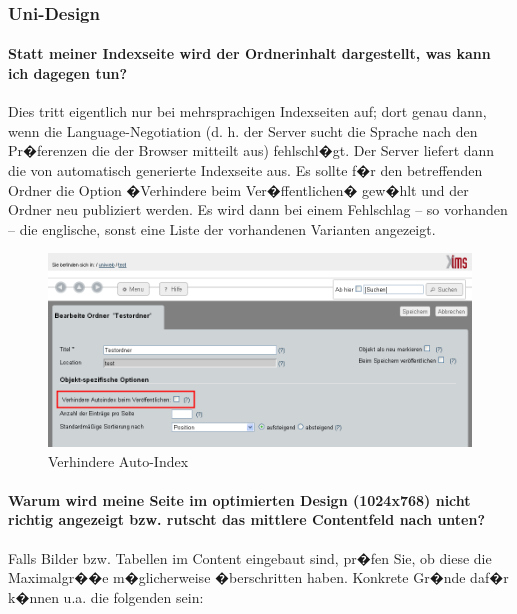 \subsubsection{Uni-Design}
\label{faq-unidesign}

\paragraph{Statt meiner Indexseite wird der Ordnerinhalt dargestellt, was kann ich
dagegen tun?}

Dies tritt eigentlich nur bei mehrsprachigen Indexseiten auf; dort genau dann, wenn
die Language-Negotiation (d. h. der Server sucht die Sprache nach den Pr�ferenzen
die der Browser mitteilt aus) fehlschl�gt. Der Server liefert dann die von 
automatisch generierte Indexseite aus. Es sollte f�r den betreffenden Ordner die
Option �Verhindere  beim Ver�ffentlichen� gew�hlt und der Ordner neu
publiziert werden. Es wird dann bei einem Fehlschlag -- so vorhanden -- die englische,
sonst eine Liste der vorhandenen Varianten angezeigt.

\begin{figure}[!ht]
	\centering
		\includegraphics[width=\textwidth]{./images/autoindex.png}
	\caption{Verhindere Auto-Index}
	\label{fig:disableautoindex}
\end{figure}

\paragraph{Warum wird meine Seite im optimierten Design (1024x768) nicht richtig
angezeigt bzw. rutscht das mittlere Contentfeld nach unten?}

Falls Bilder bzw. Tabellen im Content eingebaut sind, pr�fen Sie, ob diese die
Maximalgr��e m�glicherweise �berschritten haben.
Konkrete Gr�nde daf�r k�nnen u.a. die folgenden sein:

